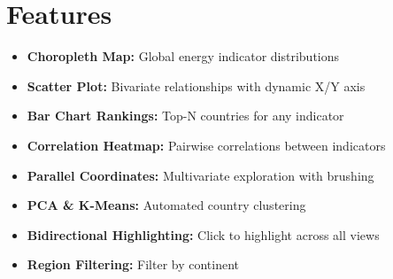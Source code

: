 \documentclass[11pt]{article}
\begin{document}
\section{Features}

\begin{itemize}
    \item \textbf{Choropleth Map:} Global energy indicator distributions
    \item \textbf{Scatter Plot:} Bivariate relationships with dynamic X/Y axis
    \item \textbf{Bar Chart Rankings:} Top-N countries for any indicator
    \item \textbf{Correlation Heatmap:} Pairwise correlations between indicators
    \item \textbf{Parallel Coordinates:} Multivariate exploration with brushing
    \item \textbf{PCA \& K-Means:} Automated country clustering
    \item \textbf{Bidirectional Highlighting:} Click to highlight across all views
    \item \textbf{Region Filtering:} Filter by continent
\end{itemize}
\end{document}

